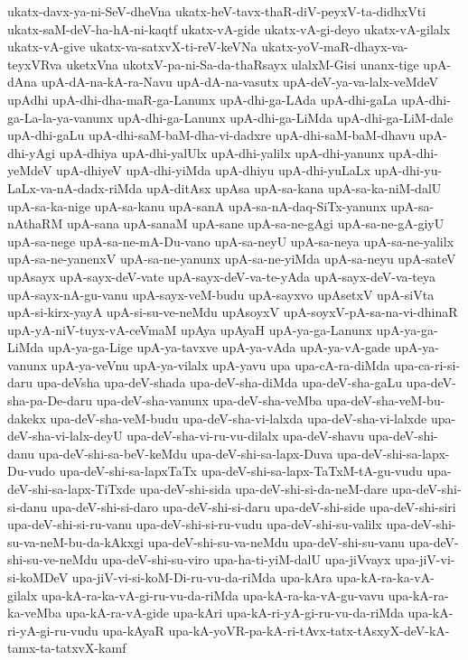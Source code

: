 {ukatx-davx-ya-ni-SeV-dheVna
ukatx-heV-tavx-thaR-diV-peyxV-ta-didhxVti
ukatx-saM-deV-ha-hA-ni-kaqtf
ukatx-vA-gide
ukatx-vA-gi-deyo
ukatx-vA-gilalx
ukatx-vA-give
ukatx-va-satxvX-ti-reV-keVNa
ukatx-yoV-maR-dhayx-va-teyxVRva
uketxVna
ukotxV-pa-ni-Sa-da-thaRsayx
ulalxM-Gisi
unanx-tige
upA-dAna
upA-dA-na-kA-ra-Navu
upA-dA-na-vasutx
upA-deV-ya-va-lalx-veMdeV
upAdhi
upA-dhi-dha-maR-ga-Lanunx
upA-dhi-ga-LAda
upA-dhi-gaLa
upA-dhi-ga-La-la-ya-vanunx
upA-dhi-ga-Lanunx
upA-dhi-ga-LiMda
upA-dhi-ga-LiM-dale
upA-dhi-gaLu
upA-dhi-saM-baM-dha-vi-dadxre
upA-dhi-saM-baM-dhavu
upA-dhi-yAgi
upA-dhiya
upA-dhi-yalUlx
upA-dhi-yalilx
upA-dhi-yanunx
upA-dhi-yeMdeV
upA-dhiyeV
upA-dhi-yiMda
upA-dhiyu
upA-dhi-yuLaLx
upA-dhi-yu-LaLx-va-nA-dadx-riMda
upA-ditAsx
upAsa
upA-sa-kana
upA-sa-ka-niM-dalU
upA-sa-ka-nige
upA-sa-kanu
upA-sanA
upA-sa-nA-daq-SiTx-yanunx
upA-sa-nAthaRM
upA-sana
upA-sanaM
upA-sane
upA-sa-ne-gAgi
upA-sa-ne-gA-giyU
upA-sa-nege
upA-sa-ne-mA-Du-vano
upA-sa-neyU
upA-sa-neya
upA-sa-ne-yalilx
upA-sa-ne-yanenxV
upA-sa-ne-yanunx
upA-sa-ne-yiMda
upA-sa-neyu
upA-sateV
upAsayx
upA-sayx-deV-vate
upA-sayx-deV-va-te-yAda
upA-sayx-deV-va-teya
upA-sayx-nA-gu-vanu
upA-sayx-veM-budu
upA-sayxvo
upAsetxV
upA-siVta
upA-si-kirx-yayA
upA-si-su-ve-neMdu
upAsoyxV
upA-soyxV-pA-sa-na-vi-dhinaR
upA-yA-niV-tuyx-vA-ceVmaM
upAya
upAyaH
upA-ya-ga-Lanunx
upA-ya-ga-LiMda
upA-ya-ga-Lige
upA-ya-tavxve
upA-ya-vAda
upA-ya-vA-gade
upA-ya-vanunx
upA-ya-veVnu
upA-ya-vilalx
upA-yavu
upa
upa-cA-ra-diMda
upa-ca-ri-si-daru
upa-deVsha
upa-deV-shada
upa-deV-sha-diMda
upa-deV-sha-gaLu
upa-deV-sha-pa-De-daru
upa-deV-sha-vanunx
upa-deV-sha-veMba
upa-deV-sha-veM-bu-dakekx
upa-deV-sha-veM-budu
upa-deV-sha-vi-lalxda
upa-deV-sha-vi-lalxde
upa-deV-sha-vi-lalx-deyU
upa-deV-sha-vi-ru-vu-dilalx
upa-deV-shavu
upa-deV-shi-danu
upa-deV-shi-sa-beV-keMdu
upa-deV-shi-sa-lapx-Duva
upa-deV-shi-sa-lapx-Du-vudo
upa-deV-shi-sa-lapxTaTx
upa-deV-shi-sa-lapx-TaTxM-tA-gu-vudu
upa-deV-shi-sa-lapx-TiTxde
upa-deV-shi-sida
upa-deV-shi-si-da-neM-dare
upa-deV-shi-si-danu
upa-deV-shi-si-daro
upa-deV-shi-si-daru
upa-deV-shi-side
upa-deV-shi-siri
upa-deV-shi-si-ru-vanu
upa-deV-shi-si-ru-vudu
upa-deV-shi-su-valilx
upa-deV-shi-su-va-neM-bu-da-kAkxgi
upa-deV-shi-su-va-neMdu
upa-deV-shi-su-vanu
upa-deV-shi-su-ve-neMdu
upa-deV-shi-su-viro
upa-ha-ti-yiM-dalU
upa-jiVvayx
upa-jiV-vi-si-koMDeV
upa-jiV-vi-si-koM-Di-ru-vu-da-riMda
upa-kAra
upa-kA-ra-ka-vA-gilalx
upa-kA-ra-ka-vA-gi-ru-vu-da-riMda
upa-kA-ra-ka-vA-gu-vavu
upa-kA-ra-ka-veMba
upa-kA-ra-vA-gide
upa-kAri
upa-kA-ri-yA-gi-ru-vu-da-riMda
upa-kA-ri-yA-gi-ru-vudu
upa-kAyaR
upa-kA-yoVR-pa-kA-ri-tAvx-tatx-tAsxyX-deV-kA-tamx-ta-tatxvX-kamf
}
